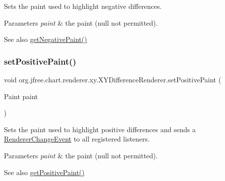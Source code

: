 Sets the paint used to highlight negative differences.


\begin{DoxyParams}{Parameters}
{\em paint} & the paint ({\ttfamily null} not permitted).\\
\hline
\end{DoxyParams}
\begin{DoxySeeAlso}{See also}
\mbox{\hyperlink{classorg_1_1jfree_1_1chart_1_1renderer_1_1xy_1_1_x_y_difference_renderer_a3e10af01cab6acff914d6b2adf9e8371}{get\+Negative\+Paint()}} 
\end{DoxySeeAlso}
\mbox{\label{classorg_1_1jfree_1_1chart_1_1renderer_1_1xy_1_1_x_y_difference_renderer_aff455c06592dff18318ed28661cb7860}} 
\subsubsection{\texorpdfstring{set\+Positive\+Paint()}{setPositivePaint()}}
{\footnotesize\ttfamily void org.\+jfree.\+chart.\+renderer.\+xy.\+X\+Y\+Difference\+Renderer.\+set\+Positive\+Paint (\begin{DoxyParamCaption}\item[{Paint}]{paint }\end{DoxyParamCaption})}

Sets the paint used to highlight positive differences and sends a \mbox{\hyperlink{}{Renderer\+Change\+Event}} to all registered listeners.


\begin{DoxyParams}{Parameters}
{\em paint} & the paint ({\ttfamily null} not permitted).\\
\hline
\end{DoxyParams}
\begin{DoxySeeAlso}{See also}
\mbox{\hyperlink{classorg_1_1jfree_1_1chart_1_1renderer_1_1xy_1_1_x_y_difference_renderer_a6af43e7afd9ffcacb0d8569d7826902b}{get\+Positive\+Paint()}} 
\end{DoxySeeAlso}
\mbox{\label{classorg_1_1jfree_1_1chart_1_1renderer_1_1xy_1_1_x_y_difference_renderer_add148660ff1686d7228fd9a525ccb23c}} 
